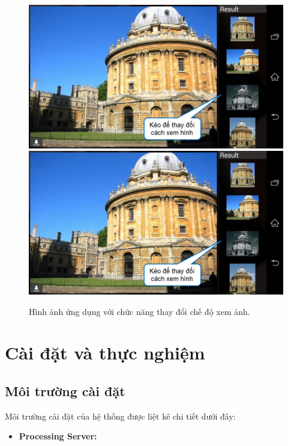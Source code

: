 {\begin{figure}[!htbp]
  \begin{center}
    \leavevmode
    \ifpdf
      \includegraphics[scale=0.17]{interface_6}
    \else
      \includegraphics[scale=0.17]{interface_6}
    \fi
    \caption[Ứng dụng cho phép người dùng thay đổi chế độ xem hình ảnh truy vấn bằng cách kéo khung kết quả để thu nhỏ, phóng to hình ảnh đang xem.]{Hình ảnh ứng dụng với chức năng thay đổi chế độ xem ảnh.}
    \label{FigChooseRegion}
  \end{center}
\end{figure}

\section{Cài đặt và thực nghiệm}
\label{c5-caidat}
	\subsection{Môi trường cài đặt}
	Môi trường cài đặt của hệ thống được liệt kê chi tiết dưới đây:
	
	\begin{itemize}
	\item \textbf{Processing Server:}
	

\end{itemize}}
